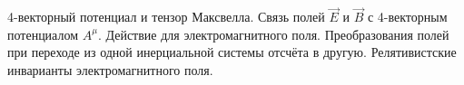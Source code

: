 \documentclass[__main__.tex]{subfiles}
\begin{document}
4-векторный потенциал и тензор Максвелла. Связь полей $\vec{E}$ и $\vec{B}$ с 4-векторным потенциалом $A^\mu$. Действие для электромагнитного поля. Преобразования полей при переходе из одной инерциальной системы отсчёта в другую. Релятивистские инварианты электромагнитного поля.\\ 

\end{document}
